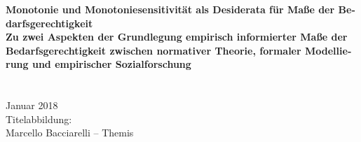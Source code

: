 \begin{titlepage}
\begin{otherlanguage}{ngerman}
\onehalfspacing
{}
\begin{center}
\begin{figure}[t]
\end{figure}
{\Large \textbf{Monotonie und Monotoniesensitivität als Desiderata für Maße der Bedarfsgerechtigkeit}}\\[0.5cm]
{\large \textbf{Zu zwei Aspekten der Grundlegung empirisch informierter Maße der Bedarfsgerechtigkeit zwischen normativer Theorie, formaler Modellierung und empirischer Sozialforschung}}\\[2cm]
\\[1cm]
{\large \textbf{\DeinName}}\\[0.5cm]
Januar 2018\\[0.5cm]
Titelabbildung:\\
Marcello Bacciarelli -- Themis
\end{center}
\end{otherlanguage}
\end{titlepage}
\restoregeometry
\MSonehalfspacing
\cleardoublepage
{}
